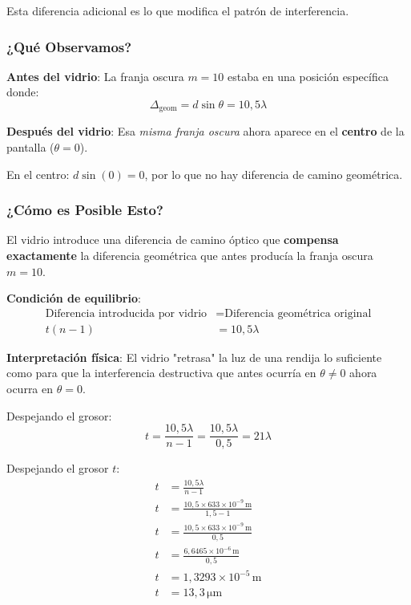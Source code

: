\documentclass[
  11pt,
  letterpaper,
   addpoints,
   answers
  ]{exam}
\begin{document}
\begin{questions}
\begin{solution}
Esta diferencia adicional es lo que modifica el patrón de interferencia.

\subsubsection*{¿Qué Observamos?}

\textbf{Antes del vidrio}: La franja oscura $m = 10$ estaba en una posición específica donde:
\[\Delta_{\text{geom}} = d \sin \theta = 10{,}5\lambda\]

\textbf{Después del vidrio}: Esa \textit{misma franja oscura} ahora aparece en el \textbf{centro} de la pantalla ($\theta = 0$).

En el centro: $d \sin(0) = 0$, por lo que no hay diferencia de camino geométrica.

\subsubsection*{¿Cómo es Posible Esto?}

El vidrio introduce una diferencia de camino óptico que \textbf{compensa exactamente} la diferencia geométrica que antes producía la franja oscura $m = 10$.

\textbf{Condición de equilibrio}:
\begin{align}
\text{Diferencia introducida por vidrio} &= \text{Diferencia geom\'{e}trica original}\\
t(n - 1) &= 10{,}5\lambda
\end{align}

\textbf{Interpretación física}: El vidrio "retrasa" la luz de una rendija lo suficiente como para que la interferencia destructiva que antes ocurría en $\theta \neq 0$ ahora ocurra en $\theta = 0$.

Despejando el grosor:
\begin{equation}
t = \frac{10{,}5\lambda}{n - 1} = \frac{10{,}5\lambda}{0{,}5} = 21\lambda
\end{equation}

Despejando el grosor $t$:
\begin{align}
t &= \frac{10{,}5 \lambda}{n - 1} \\
t &= \frac{10{,}5 \times 633 \times 10^{-9}\,\mathrm{m}}{1{,}5 - 1} \\
t &= \frac{10{,}5 \times 633 \times 10^{-9}\,\mathrm{m}}{0{,}5} \\
t &= \frac{6{,}6465 \times 10^{-6}\,\mathrm{m}}{0{,}5} \\
t &= 1{,}3293 \times 10^{-5}\,\mathrm{m} \\
t &= 13{,}3\,\mathrm{\mu m}
\end{align}


\end{solution}
\end{questions}
\end{document}
